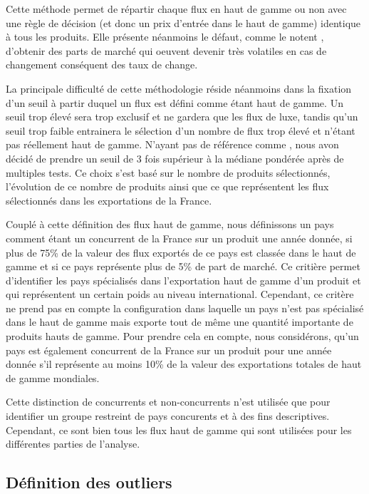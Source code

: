\documentclass[french,10pt,a4paper]{article}
\begin{document}
Cette méthode permet de répartir chaque flux en haut de gamme ou non avec une règle de décision (et donc un prix d'entrée dans le haut de gamme) identique à tous les produits. Elle présente néanmoins le défaut, comme le notent \cite{Martin2015}, d'obtenir des parts de marché qui oeuvent devenir très volatiles en cas de changement conséquent des taux de change.

La principale difficulté de cette méthodologie réside néanmoins dans la fixation d'un seuil à partir duquel un flux est défini comme étant haut de gamme. Un seuil trop élevé sera trop exclusif et ne gardera que les flux de luxe, tandis qu'un seuil trop faible entrainera le sélection d'un nombre de flux trop élevé et n'étant pas réellement haut de gamme. N'ayant pas de référence comme \cite{Martin2015}, nous avon décidé de prendre un seuil de 3 fois supérieur à la médiane pondérée après de multiples tests. Ce choix s'est basé sur le nombre de produits sélectionnés, l'évolution de ce nombre de produits ainsi que ce que représentent les flux sélectionnés dans les exportations de la France.

\medskip

Couplé à cette définition des flux haut de gamme, nous définissons un pays comment étant un concurrent de la France sur un produit une année donnée, si plus de 75\% de la valeur des flux exportés de ce pays est classée dans le haut de gamme et si ce pays représente plus de 5\% de part de marché. Ce critière permet d'identifier les pays spécialisés dans l'exportation haut de gamme d'un produit et qui représentent un certain poids au niveau international. Cependant, ce critère ne prend pas en compte la configuration dans laquelle un pays n'est pas spécialisé dans le haut de gamme mais exporte tout de même une quantité importante de produits hauts de gamme. Pour prendre cela en compte, nous considérons, qu'un pays est également concurrent de la France sur un produit pour une année donnée s'il représente au moins 10\% de la valeur des exportations totales de haut de gamme mondiales.

Cette distinction de concurrents et non-concurrents n'est utilisée que pour identifier un groupe restreint de pays concurents et à des fins descriptives. Cependant, ce sont bien tous les flux haut de gamme qui sont utilisées pour les différentes parties de l'analyse. 

\subsection{Définition des outliers}
\end{document}
